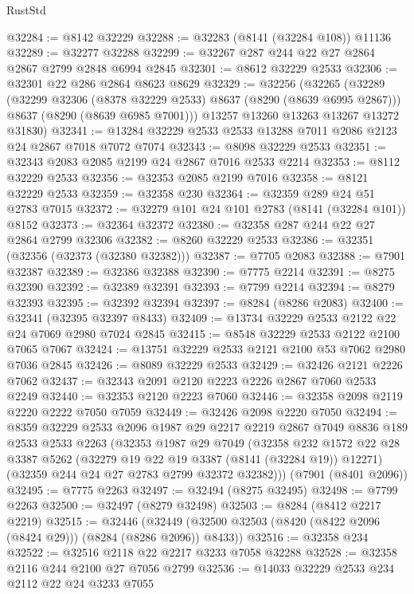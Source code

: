 \begin{lexlean}{RustStd}
\begin{coremodule}
@32284 := @8142 @32229
@32288 := @32283 (@8141 (@32284 @108)) @11136
@32289 := @32277 @32288
@32299 := @32267 @287 @244 @22 @27 @2864 @2867 @2799 @2848 @6994 @2845
@32301 := @8612 @32229 @2533
@32306 := @32301 @22 @286 @2864 @8623 @8629
@32329 := @32256
    (@32265
      (@32289
        (@32299 @32306 (@8378 @32229 @2533) @8637 (@8290 (@8639 @6995 @2867)))
        @8637
        (@8290 (@8639 @6985 @7001)))
      @13257
      @13260
      @13263
      @13267
      @13272
      @31830)
@32341 := @13284 @32229 @2533 @2533 @13288 @7011 @2086 @2123 @24 @2867 @7018 @7072 @7074
@32343 := @8098 @32229 @2533
@32351 := @32343 @2083 @2085 @2199 @24 @2867 @7016 @2533 @2214
@32353 := @8112 @32229 @2533
@32356 := @32353 @2085 @2199 @7016
@32358 := @8121 @32229 @2533
@32359 := @32358 @230
@32364 := @32359 @289 @24 @51 @2783 @7015
@32372 := @32279 @101 @24 @101 @2783 (@8141 (@32284 @101)) @8152
@32373 := @32364 @32372
@32380 := @32358 @287 @244 @22 @27 @2864 @2799 @32306
@32382 := @8260 @32229 @2533
@32386 := @32351 (@32356 (@32373 (@32380 @32382)))
@32387 := @7705 @2083
@32388 := @7901 @32387
@32389 := @32386 @32388
@32390 := @7775 @2214
@32391 := @8275 @32390
@32392 := @32389 @32391
@32393 := @7799 @2214
@32394 := @8279 @32393
@32395 := @32392 @32394
@32397 := @8284 (@8286 @2083)
@32400 := @32341 (@32395 @32397 @8433)
@32409 := @13734 @32229 @2533 @2122 @22 @24 @7069 @2980 @7024 @2845
@32415 := @8548 @32229 @2533 @2122 @2100 @7065 @7067
@32424 := @13751 @32229 @2533 @2121 @2100 @53 @7062 @2980 @7036 @2845
@32426 := @8089 @32229 @2533
@32429 := @32426 @2121 @2226 @7062
@32437 := @32343 @2091 @2120 @2223 @2226 @2867 @7060 @2533 @2249
@32440 := @32353 @2120 @2223 @7060
@32446 := @32358 @2098 @2119 @2220 @2222 @7050 @7059
@32449 := @32426 @2098 @2220 @7050
@32494 := @8359
    @32229
    @2533
    @2096
    @1987
    @29
    @2217
    @2219
    @2867
    @7049
    @8836
    @189
    @2533
    @2533
    @2263
    (@32353
      @1987
      @29
      @7049
      (@32358
        @232
        @1572
        @22
        @28
        @3387
        @5262
        (@32279 @19 @22 @19 @3387 (@8141 (@32284 @19)) @12271)
        (@32359 @244 @24 @27 @2783 @2799 @32372 @32382)))
    (@7901 (@8401 @2096))
@32495 := @7775 @2263
@32497 := @32494 (@8275 @32495)
@32498 := @7799 @2263
@32500 := @32497 (@8279 @32498)
@32503 := @8284 (@8412 @2217 @2219)
@32515 := @32446
    (@32449 (@32500 @32503 (@8420 (@8422 @2096 (@8424 @29))) (@8284 (@8286 @2096)) @8433))
@32516 := @32358 @234
@32522 := @32516 @2118 @22 @2217 @3233 @7058 @32288
@32528 := @32358 @2116 @244 @2100 @27 @7056 @2799
@32536 := @14033 @32229 @2533 @234 @2112 @22 @24 @3233 @7055

\end{coremodule}
\end{lexlean}

